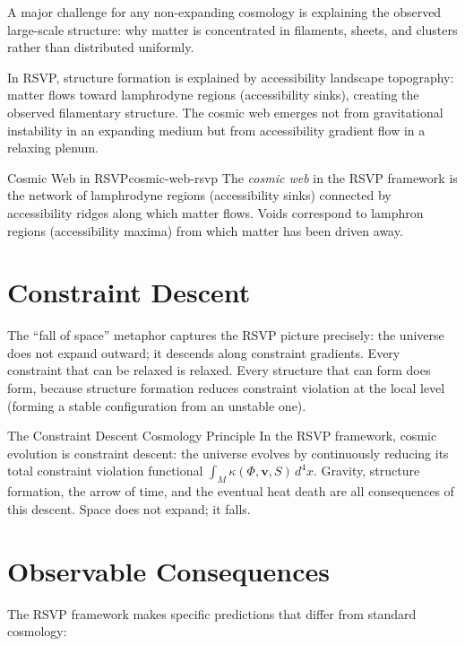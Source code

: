 A major challenge for any non-expanding cosmology is explaining the
observed large-scale structure: why matter is concentrated in filaments,
sheets, and clusters rather than distributed uniformly.

In RSVP, structure formation is explained by accessibility landscape
topography: matter flows toward lamphrodyne regions (accessibility sinks),
creating the observed filamentary structure. The cosmic web emerges
not from gravitational instability in an expanding medium but from
accessibility gradient flow in a relaxing plenum.

\begin{definition}{Cosmic Web in RSVP}{cosmic-web-rsvp}
  The \emph{cosmic web} in the RSVP framework is the network of
  lamphrodyne regions (accessibility sinks) connected by accessibility
  ridges along which matter flows. Voids correspond to lamphron regions
  (accessibility maxima) from which matter has been driven away.
\end{definition}

\section{Constraint Descent}

The ``fall of space'' metaphor captures the RSVP picture precisely:
the universe does not expand outward; it descends along constraint
gradients. Every constraint that can be relaxed is relaxed. Every
structure that can form does form, because structure formation reduces
constraint violation at the local level (forming a stable configuration
from an unstable one).

\begin{namedthm}{The Constraint Descent Cosmology Principle}
  In the RSVP framework, cosmic evolution is constraint descent: the
  universe evolves by continuously reducing its total constraint
  violation functional $\int_M \kappa(\Phi,\mathbf{v},S)\,d^4x$.
  Gravity, structure formation, the arrow of time, and the eventual
  heat death are all consequences of this descent. Space does not
  expand; it falls.
\end{namedthm}

\section{Observable Consequences}

The RSVP framework makes specific predictions that differ from standard
cosmology:

